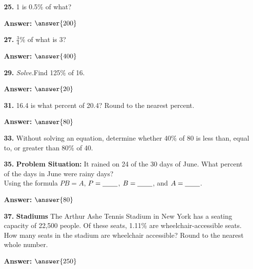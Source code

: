 \documentclass{ximera}
\begin{document}
\begin{problem}
\textbf{25.} 1 is 0.5\% of what?

\textbf{Answer:} $\answer{200}$
\end{problem}

\begin{problem}
\textbf{27.} $\frac{3}{4}\%$ of what is 3?

\textbf{Answer:} $\answer{400}$
\end{problem}

\begin{problem}
\textbf{29.} \emph{Solve.}\quad Find 125\% of 16.

\textbf{Answer:} $\answer{20}$
\end{problem}

\begin{problem}
\textbf{31.} 16.4 is what percent of 20.4? Round to the nearest percent.

\textbf{Answer:} $\answer{80}$
\end{problem}

\begin{problem}
\textbf{33.} Without solving an equation, determine whether 40\% of 80 is less than, equal to,
  or greater than 80\% of 40.

\begin{multipleChoice}
\end{multipleChoice}
\end{problem}

\begin{problem}
\textbf{35.} \textbf{Problem Situation:} It rained on 24 of the 30 days of June. What percent
  of the days in June were rainy days?
  \\[2pt]
  \hspace*{1.5em}Using the formula $PB = A$, $P = \underline{\hspace{2.2em}}$, $B = \underline{\hspace{2.2em}}$, and
  $A = \underline{\hspace{2.2em}}$.

\textbf{Answer:} $\answer{80}$
\end{problem}

\begin{problem}
\textbf{37.} \textbf{Stadiums} The Arthur Ashe Tennis Stadium in New York has a seating
  capacity of 22,500 people. Of these seats, 1.11\% are wheelchair-accessible seats.
  How many seats in the stadium are wheelchair accessible? Round to the nearest whole
  number.

\textbf{Answer:} $\answer{250}$
\end{problem}
\end{document}
